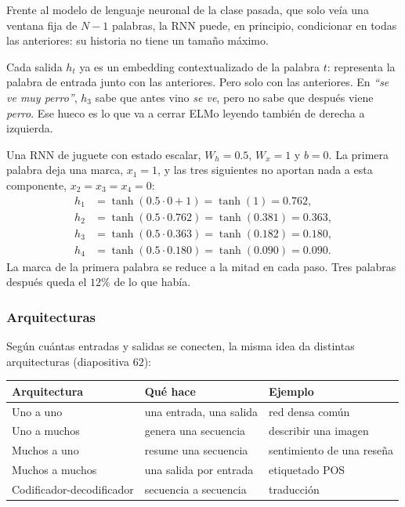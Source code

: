 \documentclass[11pt,letterpaper]{article}
\begin{document}
Frente al modelo de lenguaje neuronal de la clase pasada, que solo veía
una ventana fija de $N - 1$ palabras, la RNN puede, en principio,
condicionar en todas las anteriores: su historia no tiene un tamaño
máximo.

\begin{idea}
    Cada salida $h_t$ ya es un embedding contextualizado de la palabra
    $t$: representa la palabra de entrada junto con las anteriores. Pero
    solo con las anteriores. En \textit{``se ve muy perro''}, $h_3$
    sabe que antes vino \textit{se ve}, pero no sabe que después viene
    \textit{perro}. Ese hueco es lo que va a cerrar ELMo leyendo
    también de derecha a izquierda.
\end{idea}

\begin{ejemplo}
    Una RNN de juguete con estado escalar, $W_h = 0.5$, $W_x = 1$ y
    $b = 0$. La primera palabra deja una marca, $x_1 = 1$, y las tres
    siguientes no aportan nada a esta componente, $x_2 = x_3 = x_4 = 0$:
    \begin{align*}
        h_1 &= \tanh(0.5 \cdot 0 + 1) = \tanh(1) = 0.762 , \\
        h_2 &= \tanh(0.5 \cdot 0.762) = \tanh(0.381) = 0.363 , \\
        h_3 &= \tanh(0.5 \cdot 0.363) = \tanh(0.182) = 0.180 , \\
        h_4 &= \tanh(0.5 \cdot 0.180) = \tanh(0.090) = 0.090 .
    \end{align*}
    La marca de la primera palabra se reduce a la mitad en cada paso.
    Tres palabras después queda el $12\%$ de lo que había.
\end{ejemplo}

\subsubsection*{Arquitecturas}

Según cuántas entradas y salidas se conecten, la misma idea da
distintas arquitecturas (diapositiva $62$):

\begin{center}
\begin{tabular}{lll}
    \toprule
    \textbf{Arquitectura} & \textbf{Qué hace} & \textbf{Ejemplo} \\
    \midrule
    Uno a uno      & una entrada, una salida   & red densa común \\
    Uno a muchos   & genera una secuencia      & describir una imagen \\
    Muchos a uno   & resume una secuencia      & sentimiento de una
                                                reseña \\
    Muchos a muchos & una salida por entrada   & etiquetado POS \\
    Codificador-decodificador & secuencia a secuencia & traducción \\
    \bottomrule
\end{tabular}
\end{center}
\end{document}
